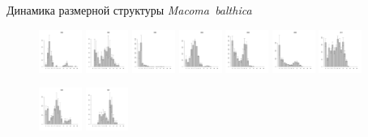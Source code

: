 \documentclass{beamer}
\begin{document}
\begin{frame}{Динамика размерной структуры {\it Macoma~balthica}}
\begin{figure}[h]
\end{figure}
\begin{figure}[h]
\includegraphics[width=14mm]{../White_Sea/Estuatiy_Luvenga/sizestr2_1993_.pdf}
\includegraphics[width=14mm]{../White_Sea/Estuatiy_Luvenga/sizestr2_1996_.pdf}
\includegraphics[width=14mm]{../White_Sea/Estuatiy_Luvenga/sizestr2_1999_.pdf}
\includegraphics[width=14mm]{../White_Sea/Estuatiy_Luvenga/sizestr2_2002_.pdf}
\includegraphics[width=14mm]{../White_Sea/Estuatiy_Luvenga/sizestr2_2005_.pdf}
\includegraphics[width=14mm]{../White_Sea/Estuatiy_Luvenga/sizestr2_2008_.pdf}
\includegraphics[width=14mm]{../White_Sea/Estuatiy_Luvenga/sizestr2_2011_.pdf}
\end{figure}
\begin{figure}[h]
\includegraphics[width=14mm]{../White_Sea/Estuatiy_Luvenga/sizestr2_1994_.pdf}
\includegraphics[width=14mm]{../White_Sea/Estuatiy_Luvenga/sizestr2_1997_.pdf}

\end{figure}
\end{frame}
\end{document}
